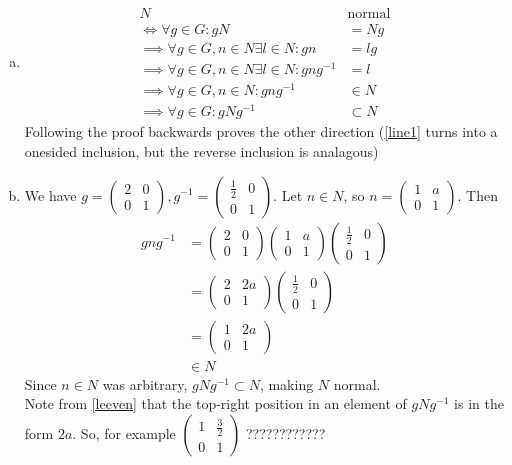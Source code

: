 \documentclass{article}
\newcommand{\inv}[1]{ {#1}^{-1} }
\begin{document}
\subsubsection{}\label{ex1p25}
\begin{enumerate}[(a)]
\item \label{ex1p25a}
\begin{align}
N &\mbox{normal}\\
\iff \forall g\in G: gN &= Ng \label{line1}\\ 
\implies \forall g\in G,n\in N\exists l \in N: gn&=lg\\
\implies \forall g\in G,n\in N\exists l \in N: gn\inv{g}&=l\\
\implies \forall g\in G,n\in N: gn\inv{g}&\in N\\
\implies \forall g\in G: gN\inv{g} &\subset N
\end{align}
Following the proof backwards proves the other direction (\eqref{line1} turns into a onesided inclusion, but the reverse inclusion is analagous)
\item \label{ex1p25b}
We have $g=\begin{pmatrix}2 & 0\\0 & 1\end{pmatrix}, \inv{g}=\begin{pmatrix}\frac{1}{2} & 0\\0 & 1\end{pmatrix}$. Let $n\in N$, so $n=\begin{pmatrix}1 & a\\0 & 1\end{pmatrix}$. Then 
\begin{align*}
gn\inv{g} &= 
\begin{pmatrix}2 & 0\\0 & 1\end{pmatrix} \begin{pmatrix}1 & a\\0 & 1\end{pmatrix} \begin{pmatrix}\frac{1}{2} & 0\\0 & 1\end{pmatrix}\\
&=
\begin{pmatrix}2 & 2a\\0 & 1\end{pmatrix}
\begin{pmatrix}\frac{1}{2} & 0\\0 & 1\end{pmatrix}\\
&= 
\begin{pmatrix}1 & 2a\\0 & 1\end{pmatrix} \label{leeven}\\
&\in N
\end{align*}
Since $n\in N$ was arbitrary, $gN\inv{g} \subset N$, making $N$ normal.\\
Note from \eqref{leeven} that the top-right position in an element of $gN\inv{g}$ is in the form $2a$. So, for example $\begin{pmatrix}1 & \frac{3}{2}\\0 & 1\end{pmatrix}$
????????????
\end{enumerate}
\end{document}

